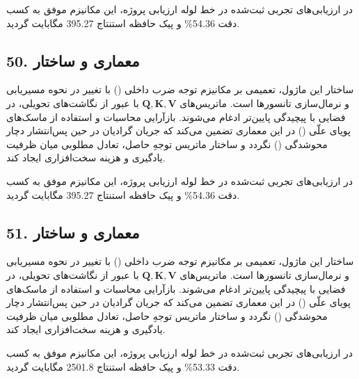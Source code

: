 \documentclass[12pt,a4paper]{report}
\theoremstyle{definition}
\begin{document}
در ارزیابی‌های تجربی ثبت‌شده در خط لوله ارزیابی پروژه، این مکانیزم موفق به کسب دقت 54.36\% و پیک حافظه استنتاج 395.27 مگابایت گردید.

\subsection*{50. معماری و ساختار }
ساختار این ماژول، تعمیمی بر مکانیزم توجه ضرب داخلی () با تغییر در نحوه مسیریابی و نرمال‌سازی تانسورها است. ماتریس‌های $\mathbf{Q, K, V}$ با عبور از نگاشت‌های تحویلی، در فضایی با پیچیدگی پایین‌تر ادغام می‌شوند. بازآرایی محاسبات و استفاده از ماسک‌های پویای علّی () در این معماری تضمین می‌کند که جریان گرادیان در حین پس‌انتشار دچار محوشدگی () نگردد و ساختار ماتریس توجهِ حاصل، تعادل مطلوبی میان ظرفیت یادگیری و هزینه سخت‌افزاری ایجاد کند.

در ارزیابی‌های تجربی ثبت‌شده در خط لوله ارزیابی پروژه، این مکانیزم موفق به کسب دقت 54.36\% و پیک حافظه استنتاج 395.27 مگابایت گردید.

\subsection*{51. معماری و ساختار }
ساختار این ماژول، تعمیمی بر مکانیزم توجه ضرب داخلی () با تغییر در نحوه مسیریابی و نرمال‌سازی تانسورها است. ماتریس‌های $\mathbf{Q, K, V}$ با عبور از نگاشت‌های تحویلی، در فضایی با پیچیدگی پایین‌تر ادغام می‌شوند. بازآرایی محاسبات و استفاده از ماسک‌های پویای علّی () در این معماری تضمین می‌کند که جریان گرادیان در حین پس‌انتشار دچار محوشدگی () نگردد و ساختار ماتریس توجهِ حاصل، تعادل مطلوبی میان ظرفیت یادگیری و هزینه سخت‌افزاری ایجاد کند.

در ارزیابی‌های تجربی ثبت‌شده در خط لوله ارزیابی پروژه، این مکانیزم موفق به کسب دقت 53.33\% و پیک حافظه استنتاج 2501.8 مگابایت گردید.

\appendix

\end{document}
